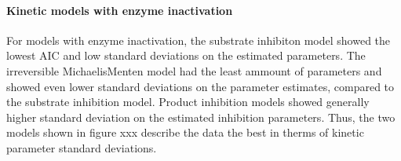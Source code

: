 \documentclass[letterpaper,10pt,english]{jupyterBook}
\begin{document}
\paragraph{Kinetic models with enzyme inactivation}
\label{\detokenize{scenarios/enzyme_inactivation:kinetic-models-with-enzyme-inactivation}}
\sphinxAtStartPar
For models with enzyme inactivation, the substrate inhibiton model showed the lowest AIC and low standard deviations on the estimated parameters. The irreversible Michaelis\sphinxhyphen{}Menten model had the least ammount of parameters and showed even lower standard deviations on the parameter estimates, compared to the substrate inhibition model. Product inhibition models showed generally higher standard deviation on the estimated inhibition parameters. Thus, the two models shown in figure xxx describe the data the best in therms of kinetic parameter standard deviations.
\end{document}
